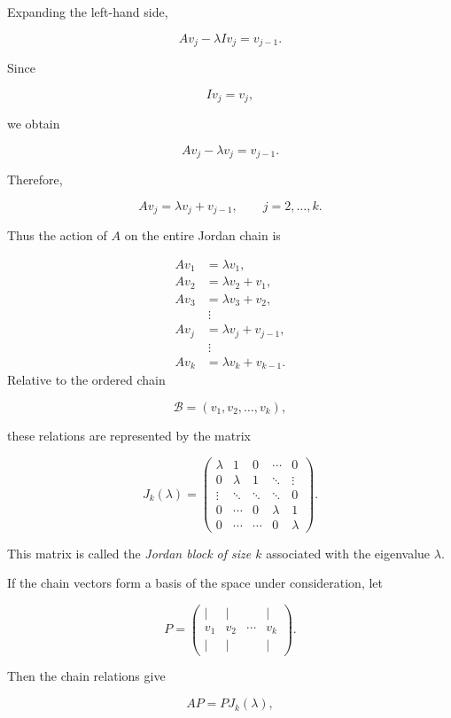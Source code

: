 \documentclass[11pt]{article}
\begin{document}
Expanding the left-hand side,

\[
Av_j-\lambda Iv_j=v_{j-1}.
\]

Since

\[
Iv_j=v_j,
\]

we obtain

\[
Av_j-\lambda v_j=v_{j-1}.
\]

Therefore,

\[
\boxed{
Av_j=\lambda v_j+v_{j-1},
\qquad j=2,\ldots,k.
}
\]

Thus the action of \(A\) on the entire Jordan chain is

\[
\boxed{
\begin{aligned}
Av_1 &= \lambda v_1,\\
Av_2 &= \lambda v_2+v_1,\\
Av_3 &= \lambda v_3+v_2,\\
&\ \vdots\\
Av_j &= \lambda v_j+v_{j-1},\\
&\ \vdots\\
Av_k &= \lambda v_k+v_{k-1}.
\end{aligned}
}
\]
Relative to the ordered chain

\[
\mathcal{B}=(v_1,v_2,\ldots,v_k),
\]

these relations are represented by the matrix

\[
\boxed{
J_k(\lambda)
=
\begin{pmatrix}
\lambda & 1 & 0 & \cdots & 0\\
0 & \lambda & 1 & \ddots & \vdots\\
\vdots & \ddots & \ddots & \ddots & 0\\
0 & \cdots & 0 & \lambda & 1\\
0 & \cdots & \cdots & 0 & \lambda
\end{pmatrix}.
}
\]

This matrix is called the \emph{Jordan block of size \(k\)}
associated with the eigenvalue \(\lambda\).

If the chain vectors form a basis of the space under consideration,
let

\[
P=
\begin{pmatrix}
\vert & \vert & & \vert\\
v_1 & v_2 & \cdots & v_k\\
\vert & \vert & & \vert
\end{pmatrix}.
\]

Then the chain relations give

\[
AP=PJ_k(\lambda),
\]
\end{document}
